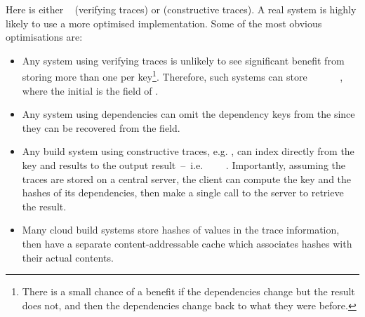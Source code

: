 Here  is either ~ (verifying traces) or
 (constructive traces). A real system is highly likely to use a more
optimised implementation. Some of the most obvious optimisations are:

\begin{itemize}
\item Any system using verifying traces is unlikely to see significant benefit
from storing more than one  per key\footnote{There is a small chance
of a benefit if the dependencies change but the result does not, and then the
dependencies change back to what they were before.}. Therefore, such systems can
store ~~~~~~, where the
initial  is the  field of .

\item Any system using  dependencies can omit the dependency
keys from the  since they can be recovered from the  field.

\item Any  build system using constructive traces, e.g.
\CloudBuild, can index directly from the key and results to the output result~--~i.e.
~~\hs{[Hash}~\hs{v])}~. Importantly, assuming the traces
are stored on a central server, the client can compute the key and the hashes of
its dependencies, then make a single call to the server to retrieve the result.

\item Many cloud build systems store hashes of values in the trace information,
then have a separate content-addressable cache which associates hashes with
their actual contents.
\vspace{-1mm}
\end{itemize}
